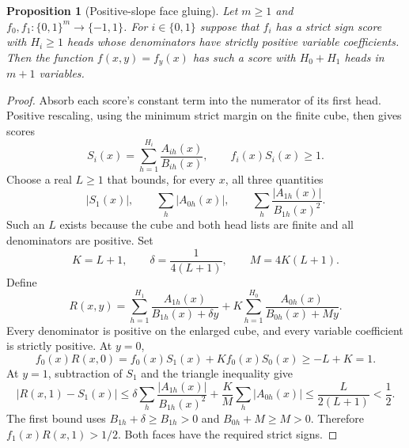 \documentclass[11pt]{article}
\newtheorem{proposition}{Proposition}
\begin{document}
\begin{proposition}[Positive-slope face gluing]
Let $m\geq1$ and $f_0,f_1:\{0,1\}^m\to\{-1,1\}$. For $i\in\{0,1\}$ suppose
that $f_i$ has a strict sign score with $H_i\geq1$ heads whose
denominators have strictly positive variable coefficients. Then the
function $f(x,y)=f_y(x)$ has such a score with $H_0+H_1$ heads in
$m+1$ variables.
\end{proposition}
\begin{proof}
Absorb each score's constant term into the numerator of its first head.
Positive rescaling, using the minimum strict margin on the finite cube,
then gives scores
\[
 S_i(x)=\sum_{h=1}^{H_i}\frac{A_{ih}(x)}{B_{ih}(x)},
 \qquad f_i(x)S_i(x)\geq1.
\]
Choose a real $L\geq1$ that bounds, for every $x$, all three quantities
\[
 |S_1(x)|,\qquad
 \sum_h|A_{0h}(x)|,\qquad
 \sum_h\frac{|A_{1h}(x)|}{B_{1h}(x)^2}.
\]
Such an $L$ exists because the cube and both head lists are finite and
all denominators are positive. Set
\[
 K=L+1,\qquad \delta=\frac1{4(L+1)},\qquad
 M=4K(L+1).
\]
Define
\[
 R(x,y)=\sum_{h=1}^{H_1}\frac{A_{1h}(x)}{B_{1h}(x)+\delta y}
       +K\sum_{h=1}^{H_0}\frac{A_{0h}(x)}{B_{0h}(x)+My}.
\]
Every denominator is positive on the enlarged cube, and every variable
coefficient is strictly positive. At $y=0$,
\[
 f_0(x)R(x,0)=f_0(x)S_1(x)+K f_0(x)S_0(x)
 \geq-L+K=1.
\]
At $y=1$, subtraction of $S_1$ and the triangle inequality give
\[
 |R(x,1)-S_1(x)|
 \leq\delta\sum_h\frac{|A_{1h}(x)|}{B_{1h}(x)^2}
      +\frac K M\sum_h|A_{0h}(x)|
 \leq\frac{L}{2(L+1)}<\frac12.
\]
The first bound uses $B_{1h}+\delta\geq B_{1h}>0$ and
$B_{0h}+M\geq M>0$. Therefore $f_1(x)R(x,1)>1/2$.
Both faces have the required strict signs.
\end{proof}
\end{document}
